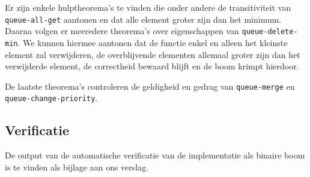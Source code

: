 \documentclass[a4paper,10pt]{article}
\begin{document}
Er zijn enkele hulptheorema's te vinden die onder andere de transitiviteit van 
\texttt{queue-all-get} aantonen en dat alle element groter zijn dan het minimum. 
Daarna volgen er meeredere theorema's over eigenschappen van 
\texttt{queue-delete-min}. We kunnen hiermee aantonen dat de functie enkel en 
alleen het kleinste element zal verwijderen, de overblijvende elementen allemaal 
groter zijn dan het verwijderde element, de correctheid bewaard blijft en de 
boom krimpt hierdoor.

De laatste theorema's controleren de geldigheid en gedrag van \texttt{queue-merge}
en \texttt{queue-change-priority}.

\subsection{Verificatie}

De output van de automatische verificatie van de implementatie als binaire boom
is te vinden als bijlage aan ons verslag.
\end{document}
